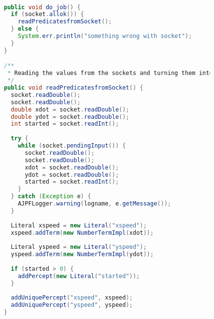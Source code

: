 \begin{figure}[!htbp]
\begin{ourexample}
\label{code:do_job} \quad \\
\begin{lstlisting}[basicstyle=\sffamily,language=Java,style=easslisting]
public void do_job() {
  if (socket.allok()) {
    readPredicatesfromSocket();
  }	else {
    System.err.println("something wrong with socket");
  }
}

/**
 * Reading the values from the sockets and turning them into perceptions.
 */
public void readPredicatesfromSocket() {
  socket.readDouble();
  socket.readDouble();
  double xdot = socket.readDouble();
  double ydot = socket.readDouble();
  int started = socket.readInt();
		
  try {
    while (socket.pendingInput()) {
      socket.readDouble();
      socket.readDouble();
      xdot = socket.readDouble();
      ydot = socket.readDouble();
      started = socket.readInt();			
    }
  } catch (Exception e) {
    AJPFLogger.warning(logname, e.getMessage());
  } 
		
  Literal xspeed = new Literal("xspeed");
  xspeed.addTerm(new NumberTermImpl(xdot));
		
  Literal yspeed = new Literal("yspeed");
  yspeed.addTerm(new NumberTermImpl(ydot));
		
  if (started > 0) {
    addPercept(new Literal("started"));
  }
		
  addUniquePercept("xspeed", xspeed);
  addUniquePercept("yspeed", yspeed);
}
\end{lstlisting}
\end{ourexample}
\end{figure}
